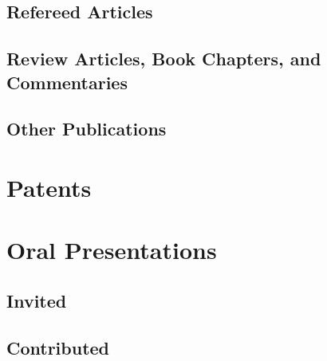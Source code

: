 \documentclass[letter,11pt]{article}
\begin{document}
\subsection{Refereed Articles}
\begin{refsection}
\nocite{*}
\printbibliography[heading=none, locallabelwidth=true]
\end{refsection}

\subsection{Review Articles, Book Chapters, and Commentaries}
\begin{refsection}
\nocite{*}
\printbibliography[heading=none, locallabelwidth=true]
\end{refsection}

\subsection{Other Publications}
\begin{refsection}
\nocite{*}
\printbibliography[heading=none, locallabelwidth=true]
\end{refsection}

\section{Patents}
\begin{refsection}
\nocite{*}
\printbibliography[heading=none, locallabelwidth=true]
\end{refsection}

\section{Oral Presentations}
\subsection{Invited}

\subsection{Contributed}
\end{document}
